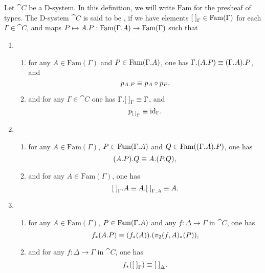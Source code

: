 \begin{defn}
Let $\cat{C}$ be a D-system. In this definition, we will write
$\mathrm{Fam}$ for the presheaf of types. The D-system $\cat{C}$
is said to be , if we have elements ${[\;]}_{\Gamma}\in
\mathrm{Fam}(\Gamma)$ for each $\Gamma\in\cat{C}$, and maps 
$P\mapsto\ctxext{A}{P}:\mathrm{Fam}(\ctxext{\Gamma}{A})\to \mathrm{Fam}(\Gamma)$
such that
\begin{enumerate}
\item 
\begin{enumerate}
\item for any $A\in\mathrm{Fam}(\Gamma)$ and $P\in\mathrm{Fam}(\ctxext{\Gamma}{A})$,
one has $\ctxext{\Gamma}{{A}{P}}\jdeq\ctxext{{\Gamma}{A}}{P}$, and
\begin{equation*}
p_{\ctxext{A}{P}}\jdeq p_A\circ p_P,
\end{equation*}
\item and for any $\Gamma\in\cat{C}$ one has $\ctxext{\Gamma}{\emptyf[\Gamma]}\jdeq\Gamma$, and
\begin{equation*}
p_{{[\;]}_{\Gamma}}\equiv{\mathrm{id}_{\Gamma}}.
\end{equation*}
\end{enumerate}
\item 
\begin{enumerate}
\item for any $A\in\mathrm{Fam}(\Gamma)$, $P\in\mathrm{Fam}(\ctxext{\Gamma}{A})$
and $Q\in\mathrm{Fam}(\ctxext{{\Gamma}{A}}{P})$, one has
\begin{equation*}
\ctxext{{A}{P}}{Q}\jdeq\ctxext{A}{{P}{Q}},
\end{equation*}
\item and for any $A\in\mathrm{Fam}(\Gamma)$, one has
\begin{equation*}
\ctxext{\emptyf[\Gamma]}{A}\jdeq\ctxext{A}{\emptyf[\ctxext{\Gamma}{A}]}\jdeq A.
\end{equation*}
\end{enumerate}
\item 
\begin{enumerate}
\item for any $A\in\mathrm{Fam}(\Gamma)$, $P\in\mathrm{Fam}(\ctxext{\Gamma}{A})$
and any $f:\Delta\to\Gamma$ in $\cat{C}$, one has
\begin{equation*}
f_\ast(\ctxext{A}{P})\jdeq \ctxext{(f_\ast(A))}{(\pi_2(f,A)_\ast(P))},
\end{equation*}
\item and for any $f:\Delta\to\Gamma$ in $\cat{C}$, one has
\begin{equation*}
f_\ast({[\;]}_{\Gamma})\equiv{[\;]}_{\Delta}.
\end{equation*}
\end{enumerate}
\end{enumerate} 
\end{defn}

